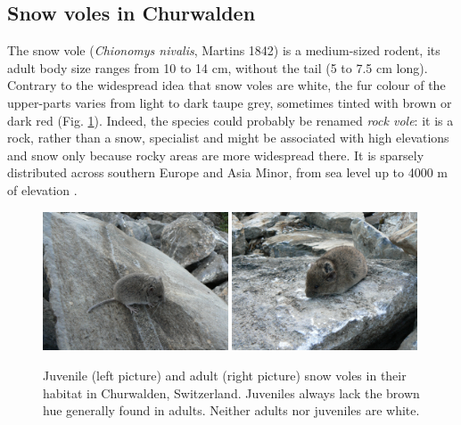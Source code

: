 \subsection{Snow voles in Churwalden}
The snow vole (\textit{Chionomys nivalis}, Martins 1842) is a medium-sized rodent, its adult body size ranges from 10 to 14 cm, without the tail (5 to 7.5 cm long). Contrary to the widespread idea that snow voles are white, the fur colour of the upper-parts varies from light to dark taupe grey, sometimes tinted with brown or dark red (Fig. \ref{fig:juvvole}). Indeed, the species could probably be renamed \emph{rock vole}: it is a rock, rather than a snow, specialist \parencite{Luque-larena2002} and might be associated with high elevations and snow only because rocky areas are more widespread there. It is sparsely distributed across southern Europe and Asia Minor, from sea level up to 4000 m of elevation \parencite{Janeau1997}.
\begin{figure}[ht]
	\includegraphics[width=0.49\textwidth]{FiguresGeneral/juvvole.JPG}
	\hspace{0.02\textwidth}
	\includegraphics[width=0.49\textwidth]{FiguresGeneral/advole.JPG}
	\caption{Juvenile (left picture) and adult (right picture) snow voles in their habitat in Churwalden, Switzerland. Juveniles always lack the brown hue generally found in adults. Neither adults nor juveniles are white.}
	\label{fig:juvvole}
\end{figure}

